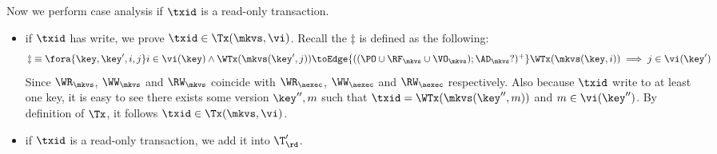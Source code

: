 \begin{itemize}
\begin{itemize}
Now we perform case analysis if \( \txid \) is a read-only transaction.
\begin{itemize}
    \item if \( \txid \) has write, we prove \( \txid \in \Tx(\mkvs, \vi)\).
        Recall the \( \ddagger \) is defined as the following:
        \begin{gather}
            \begin{array}{@{}l@{}}
                \ddagger \equiv 
                \fora{\key, \key', i, j}
                i \in \vi(\key)
                \wedge \WTx(\mkvs(\key', j))\toEdge{((\PO \cup \RF_{\mkvs} \cup \VO_{\mkvs}) ; \AD_{\mkvs}?)^{+}} \WTx(\mkvs(\key, i))
                \implies j \in \vi(\key')    
            \end{array} 
            \label{equ:si-dagger}
        \end{gather}
        Since \( \WR_\mkvs \), \( \WW_\mkvs \) and \( \RW_\mkvs \) coincide with
        \( \WR_\aexec \), \( \WW_\aexec \) and \( \RW_\aexec \) respectively.
        Also because \( \txid \) write to at least one key,
        it is easy to see there exists some version \( \key'',m\) such that 
        \( \txid = \WTx(\mkvs(\key'',m))\) and \( m \in \vi(\key'')\).
        By definition of \( \Tx \), it follows \( \txid \in \Tx(\mkvs, \vi) \).
    \item if \( \txid \) is a read-only transaction, we add it into \( \T'_\rd \).
\end{itemize}


\end{itemize}
\end{itemize}

